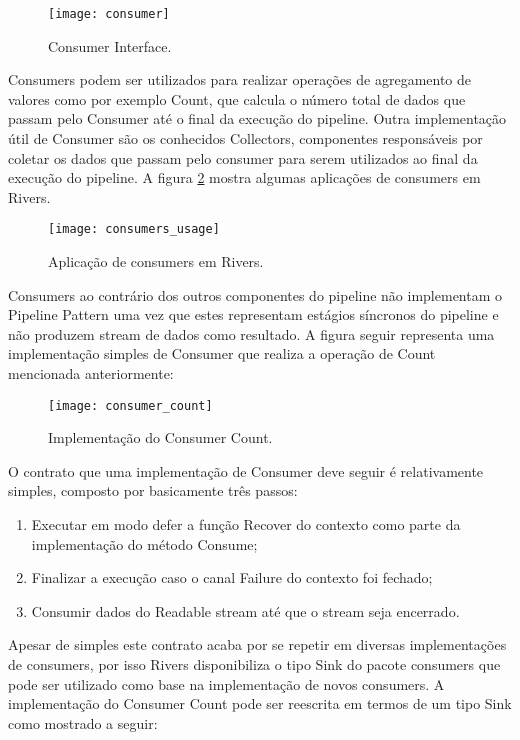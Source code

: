 \begin{figure}[H]
  \texttt{[image: consumer]}
  \centering
  \caption{Consumer Interface.}
  \label{code:rivers:consumer}
\end{figure}

Consumers podem ser utilizados para realizar operações de agregamento de valores como por exemplo Count, que calcula o número total de dados que passam pelo Consumer até o final da execução do pipeline. Outra implementação útil de Consumer são os conhecidos Collectors, componentes responsáveis por coletar os dados que passam pelo consumer para serem utilizados ao final da execução do pipeline. A figura \ref{code:rivers:consumers_usage} mostra algumas aplicações de consumers em Rivers.

\begin{figure}[H]
  \texttt{[image: consumers\_usage]}
  \centering
  \caption{Aplicação de consumers em Rivers.}
  \label{code:rivers:consumers_usage}
\end{figure}

Consumers ao contrário dos outros componentes do pipeline não implementam o Pipeline Pattern uma vez que estes representam estágios síncronos do pipeline e não produzem stream de dados como resultado. A figura seguir representa uma implementação simples de Consumer que realiza a operação de Count mencionada anteriormente:

\begin{figure}[H]
  \texttt{[image: consumer\_count]}
  \centering
  \caption{Implementação do Consumer Count.}
  \label{code:rivers:consumer_count}
\end{figure}

O contrato que uma implementação de Consumer deve seguir é relativamente simples, composto por basicamente três passos:

\begin{enumerate}
\item Executar em modo defer a função Recover do contexto como parte da implementação do método Consume;
\item Finalizar a execução caso o canal Failure do contexto foi fechado;
\item Consumir dados do Readable stream até que o stream seja encerrado.
\end{enumerate}

Apesar de simples este contrato acaba por se repetir em diversas implementações de consumers, por isso Rivers disponibiliza o tipo Sink do pacote consumers que pode ser utilizado como base na implementação de novos consumers. A implementação do Consumer Count pode ser reescrita em termos de um tipo Sink como mostrado a seguir:

